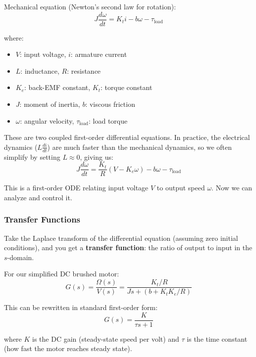 Mechanical equation (Newton's second law for rotation):
\begin{equation}
J \frac{d\omega}{dt} = K_t i - b\omega - \tau_{\text{load}}
\end{equation}

where:
\begin{itemize}[nosep]
    \item $V$: input voltage, $i$: armature current
    \item $L$: inductance, $R$: resistance
    \item $K_e$: back-EMF constant, $K_t$: torque constant
    \item $J$: moment of inertia, $b$: viscous friction
    \item $\omega$: angular velocity, $\tau_{\text{load}}$: load torque
\end{itemize}

These are two coupled first-order differential equations. In practice, the electrical dynamics ($L \frac{di}{dt}$) are much faster than the mechanical dynamics, so we often simplify by setting $L \approx 0$, giving us:
\begin{equation}
J \frac{d\omega}{dt} = \frac{K_t}{R}(V - K_e \omega) - b\omega - \tau_{\text{load}}
\end{equation}

This is a first-order ODE relating input voltage $V$ to output speed $\omega$. Now we can analyze and control it.

\subsubsection{Transfer Functions}

Take the Laplace transform of the differential equation (assuming zero initial conditions), and you get a \textbf{transfer function}: the ratio of output to input in the $s$-domain.

For our simplified DC brushed motor:
\begin{equation}
G(s) = \frac{\Omega(s)}{V(s)} = \frac{K_t / R}{Js + (b + K_t K_e / R)}
\end{equation}

This can be rewritten in standard first-order form:
\begin{equation}
G(s) = \frac{K}{\tau s + 1}
\end{equation}

where $K$ is the DC gain (steady-state speed per volt) and $\tau$ is the time constant (how fast the motor reaches steady state).

